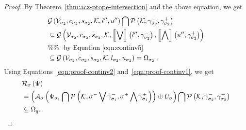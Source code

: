 \begin{proof}
%
By Theorem~\ref{thm:acz-ptope-intersection} and the above equation, we get
%
\begin{align}
& \mathcal{G}\left(\mathcal{V}_{\sigma_2},c_{\sigma_2},s_{\sigma_2},\mathcal{K},l^{\prime\prime},u^{\prime\prime}\right)\bigcap\mathcal{P}\left(\mathcal{K},\gamma_{\sigma_2}^-,\gamma_{\sigma_2}^+\right)\nonumber\\
& \subseteq \mathcal{G}\left(\mathcal{V}_{\sigma_2},c_{\sigma_2},s_{\sigma_2},\mathcal{K},\left\llbracket\bigvee\right\rrbracket\left(l^{\prime\prime},\gamma_{\sigma_2}^-\right),\left\llbracket\bigwedge\right\rrbracket\left(u^{\prime\prime},\gamma_{\sigma_2}^+\right)\right)\nonumber\\
& \%\%~~\text{by Equation~\ref{eqn:continv5}}\nonumber\\
& \subseteq \mathcal{G}\left(\mathcal{V}_{\sigma_2},c_{\sigma_2},s_{\sigma_2},\mathcal{K},l_{\sigma_2},u_{\sigma_2}\right)=\Omega_{\sigma_2}~\label{eqn:proof-continv2}.
\end{align}
%
Using Equations~\ref{eqn:proof-continv2} and~\ref{eqn:proof-continv1},
we get
\begin{align*}
& \contreach{\edge}{\Psi}\\
& =\lt(\minsum{\linmap_\edge\lt(\Psi_{\edge_1}\bigcap\ptope{\qtemp}{\join{\lsys{\edge}}{\lsys{\stay_{\edge_1}}}}{\meet{\usys{\edge}}{\usys{\stay_{\edge_1}}}}\rt)}{\inputset_{\edge}}\rt)\bigcap 
\ptope{\qtemp}{\lsys{\stay_{\edge_2}}}{\usys{\stay_{\edge_2}}}\\
& \subseteq \Omega_\loc.\hspace{25em}\qedhere
\end{align*}
%
\end{proof}
%

